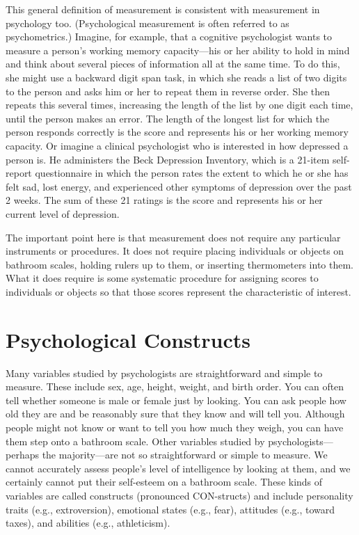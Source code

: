 \documentclass[]{book}
\theoremstyle{definition}
\theoremstyle{definition}
\theoremstyle{remark}
\begin{document}
This general definition of measurement is consistent with measurement in
psychology too. (Psychological measurement is often referred to as
psychometrics.) Imagine, for example, that a cognitive psychologist
wants to measure a person's working memory capacity---his or her ability
to hold in mind and think about several pieces of information all at the
same time. To do this, she might use a backward digit span task, in
which she reads a list of two digits to the person and asks him or her
to repeat them in reverse order. She then repeats this several times,
increasing the length of the list by one digit each time, until the
person makes an error. The length of the longest list for which the
person responds correctly is the score and represents his or her working
memory capacity. Or imagine a clinical psychologist who is interested in
how depressed a person is. He administers the Beck Depression Inventory,
which is a 21-item self-report questionnaire in which the person rates
the extent to which he or she has felt sad, lost energy, and experienced
other symptoms of depression over the past 2 weeks. The sum of these 21
ratings is the score and represents his or her current level of
depression.

The important point here is that measurement does not require any
particular instruments or procedures. It does not require placing
individuals or objects on bathroom scales, holding rulers up to them, or
inserting thermometers into them. What it does require is some
systematic procedure for assigning scores to individuals or objects so
that those scores represent the characteristic of interest.

\section{Psychological Constructs}\label{psychological-constructs}

Many variables studied by psychologists are straightforward and simple
to measure. These include sex, age, height, weight, and birth order. You
can often tell whether someone is male or female just by looking. You
can ask people how old they are and be reasonably sure that they know
and will tell you. Although people might not know or want to tell you
how much they weigh, you can have them step onto a bathroom scale. Other
variables studied by psychologists---perhaps the majority---are not so
straightforward or simple to measure. We cannot accurately assess
people's level of intelligence by looking at them, and we certainly
cannot put their self-esteem on a bathroom scale. These kinds of
variables are called constructs (pronounced CON-structs) and include
personality traits (e.g., extroversion), emotional states (e.g., fear),
attitudes (e.g., toward taxes), and abilities (e.g., athleticism).
\end{document}
